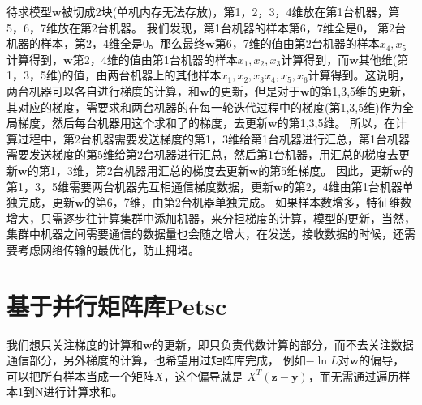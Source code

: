 \documentclass[UTF8,10pt, twoside]{article}
\begin{document}
待求模型\(\bm{w}\)被切成2块(单机内存无法存放)，第1，2，3，4维放在第1台机器，第5，6，7维放在第2台机器。
\newline\newline
我们发现，第1台机器的样本第6，7维全是0， 第2台机器的样本，第2，4维全是0。那么最终\(\bm{w}\)第6，7维的值由第2台机器的样本\(x_4,x_5\)计算得到，\(\bm{w}\)第2，4维的值由第1台机器的样本\(x_1,x_2,x_3 \)计算得到，而\(\bm{w}\)其他维(第1，3，5维)的值，由两台机器上的其他样本\(x_1,x_2,x_3 x_4, x_5, x_6\)计算得到。这说明，两台机器可以各自进行梯度的计算，和\(\bm{w}\)的更新，但是对于\(\bm{w}\)的第1,3,5维的更新，其对应的梯度，需要求和两台机器的在每一轮迭代过程中的梯度(第1,3,5维)作为全局梯度，然后每台机器用这个求和了的梯度，去更新\(\bm{w}\)的第1,3,5维。
\newline\newline
所以，在计算过程中，第2台机器需要发送梯度的第1，3维给第1台机器进行汇总，第1台机器需要发送梯度的第5维给第2台机器进行汇总，然后第1台机器，用汇总的梯度去更新\(\bm{w}\)的第1，3维，第2台机器用汇总的梯度去更新\(\bm{w}\)的第5维梯度。
\newline\newline
因此，更新\(\bm{w}\)的第1，3，5维需要两台机器先互相通信梯度数据，更新\(\bm{w}\)的第2，4维由第1台机器单独完成，更新\(\bm{w}\)的第6，7维，由第2台机器单独完成。
\newline\newline
如果样本数增多，特征维数增大，只需逐步往计算集群中添加机器，来分担梯度的计算，模型的更新，当然，集群中机器之间需要通信的数据量也会随之增大，在发送，接收数据的时候，还需要考虑网络传输的最优化，防止拥堵。

\section{基于并行矩阵库Petsc}
我们想只关注梯度的计算和\(\bm{w}\)的更新，即只负责代数计算的部分，而不去关注数据通信部分，另外梯度的计算，也希望用过矩阵库完成，
例如\(-\ln L\)对\(\bm{w}\)的偏导，可以把所有样本当成一个矩阵\(X\)，这个偏导就是 \(X^T\left(\bm{z}-\bm{y}\right)\)，而无需通过遍历样本1到N进行计算求和。
\end{document}
